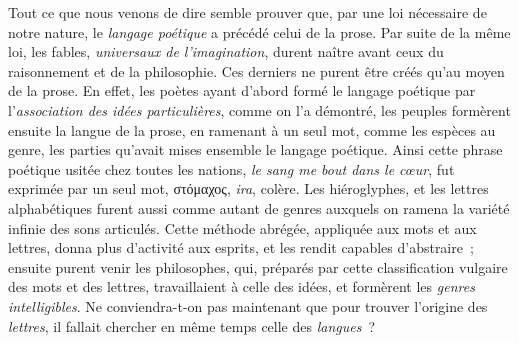 \documentclass[french,twoside]{book} %
\begin{document}
Tout ce que nous venons de dire semble prouver  que, par une loi nécessaire de notre nature, le {\itshape langage poétique} a précédé celui de la prose. Par suite de la même loi, les fables, {\itshape universaux de l’imagination}, durent naître avant ceux du raisonnement et de la philosophie. Ces derniers ne purent être créés qu’au moyen de la prose. En effet, les poètes ayant d’abord formé le langage poétique par l’{\itshape association des idées particulières}, comme on l’a démontré, les peuples formèrent ensuite la langue de la prose, en ramenant à un seul mot, comme les espèces au genre, les parties qu’avait mises ensemble le langage poétique. Ainsi cette phrase poétique usitée chez toutes les nations, {\itshape le sang me bout dans le cœur}, fut exprimée par un seul mot, στόμαχος, {\itshape ira}, colère. Les hiéroglyphes, et les lettres alphabétiques furent aussi comme autant de genres auxquels on ramena la variété infinie des sons articulés. Cette méthode abrégée, appliquée aux mots et aux lettres, donna plus d’activité aux esprits, et les rendit capables d’abstraire ; ensuite purent venir les philosophes, qui, préparés par cette classification vulgaire des mots et des lettres, travaillaient à celle des idées, et formèrent les {\itshape genres intelligibles}. Ne conviendra-t-on pas maintenant que pour trouver l’origine des {\itshape lettres}, il fallait chercher en même temps celle des {\itshape langues} ?\par
\end{document}
